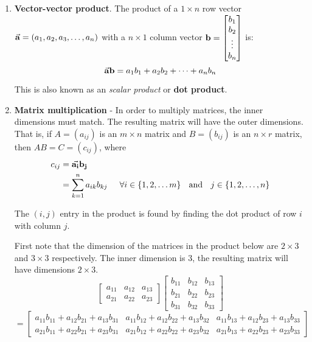 \begin{enumerate}
\item \textbf{Vector-vector product}.  The product of a $1 \times n$ row vector  $ \vec{{\bf a}} = (a_1, a_2, a_3, \dots, a_n)$ with a $n \times 1$ column vector ${\bf b} = \begin{bmatrix} b_1 \\ b_2 \\  \vdots \\ b_n \end{bmatrix}$ is:
\[ \]
\[   \vec{{\bf a}} {\bf b} = a_1 b_1 +  a_2 b_2 + \cdots + a_n b_n \]

This is also known as an \textit{scalar product} or \textbf{dot product}.







     



\item \textbf{Matrix multiplication} - In order to multiply matrices, the inner dimensions must match.  The resulting matrix will have the outer dimensions.  That is, if $A = (a_{ij})$ is an $m \times n$ matrix and $B=(b_{ij})$ is an $n \times r$ matrix, then $AB = C = (c_{ij})$, where
\begin{align*}
	c_{ij} &= \vec{{\bf a_i}} {\bf b_j} \\
		& = \sum_{k=1}^n  a_{ik} b_{kj}  \hspace{0.5cm}  \forall i \in \{1, 2, \dots m \} \text{  \; and \; } j \in \{1, 2, \dots, n \}
\end{align*}

The $(i,j)$ entry in the product is found by finding the dot product of row $i$ with column $j$.  




\begin{example} First note that the dimension of the matrices in the product below are $2 \times 3$ and $3 \times 3$ respectively.  The inner dimension is $3$, the resulting matrix will have dimensions $2 \times 3$.
\[  \begin{bmatrix}  a_{11} & a_{12} & a_{13}\\ a_{21} & a_{22} & a_{23} \end{bmatrix}  \begin{bmatrix}  b_{11} & b_{12}  & b_{13}\\ b_{21} &  b_{22}  & b_{23} \\ b_{31}  &  b_{32}  &  b_{33} \end{bmatrix} \]
\[ = 
 \begin{bmatrix}
a_{11} b_{11} + a_{12} b_{21} + a_{13} b_{31}  & a_{11} b_{12} + a_{12} b_{22} + a_{13} b_{32} & a_{11} b_{13} + a_{12} b_{23} + a_{13} b_{33}  \\
a_{21} b_{11} + a_{22} b_{21} + a_{23} b_{31}   &  a_{21} b_{12} + a_{22} b_{22} + a_{23} b_{32}   &   a_{21} b_{13} + a_{22} b_{23} + a_{23} b_{33} 
\end{bmatrix}
\]
\end{example}









\end{enumerate}
